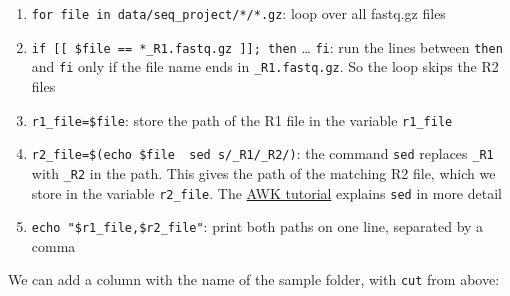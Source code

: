 \documentclass[
  letterpaper,
  DIV=11,
  numbers=noendperiod]{scrreprt}
\newenvironment{Shaded}{}{}
\newcommand{\AttributeTok}[1]{\textcolor[rgb]{0.84,0.23,0.29}{#1}}
\newcommand{\BuiltInTok}[1]{\textcolor[rgb]{0.84,0.23,0.29}{#1}}
\newcommand{\ControlFlowTok}[1]{\textcolor[rgb]{0.84,0.23,0.29}{#1}}
\newcommand{\FunctionTok}[1]{\textcolor[rgb]{0.44,0.26,0.76}{#1}}
\newcommand{\KeywordTok}[1]{\textcolor[rgb]{0.84,0.23,0.29}{#1}}
\newcommand{\NormalTok}[1]{\textcolor[rgb]{0.14,0.16,0.18}{#1}}
\newcommand{\OperatorTok}[1]{\textcolor[rgb]{0.14,0.16,0.18}{#1}}
\newcommand{\OtherTok}[1]{\textcolor[rgb]{0.44,0.26,0.76}{#1}}
\newcommand{\PreprocessorTok}[1]{\textcolor[rgb]{0.84,0.23,0.29}{#1}}
\newcommand{\StringTok}[1]{\textcolor[rgb]{0.01,0.18,0.38}{#1}}
\newcommand{\VariableTok}[1]{\textcolor[rgb]{0.89,0.38,0.04}{#1}}
\providecommand{\tightlist}{%
  \setlength{\itemsep}{0pt}\setlength{\parskip}{0pt}}
\begin{document}
\begin{tcolorbox}
\begin{enumerate}
\def\labelenumi{\arabic{enumi}.}
\tightlist
\item
  \texttt{for\ file\ in\ data/seq\_project/*/*.gz}: loop over all
  fastq.gz files
\item
  \texttt{if\ {[}{[}\ \$file\ ==\ *\_R1.fastq.gz\ {]}{]};\ then}
  \ldots{} \texttt{fi}: run the lines between \texttt{then} and
  \texttt{fi} only if the file name ends in \texttt{\_R1.fastq.gz}. So
  the loop skips the R2 files
\item
  \texttt{r1\_file=\$file}: store the path of the R1 file in the
  variable \texttt{r1\_file}
\item
  \texttt{r2\_file=\$(echo\ \$file\ \textbar{}\ sed\ \textquotesingle{}s/\_R1/\_R2/\textquotesingle{})}:
  the command \texttt{sed} replaces \texttt{\_R1} with \texttt{\_R2} in
  the path. This gives the path of the matching R2 file, which we store
  in the variable \texttt{r2\_file}. The
  \href{https://ndombrowski.github.io/AWK_tutorial/source/sed_basics.html\#the-shape-of-a-sed-command}{AWK
  tutorial} explains \texttt{sed} in more detail
\item
  \texttt{echo\ "\$r1\_file,\$r2\_file"}: print both paths on one line,
  separated by a comma
\end{enumerate}

We can add a column with the name of the sample folder, with
\texttt{cut} from above:

\begin{Shaded}
\end{Shaded}


\end{tcolorbox}
\end{document}

